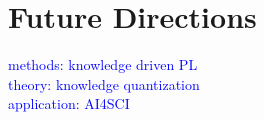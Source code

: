 \section{Future Directions}

\textcolor{blue}{methods: knowledge driven PL}\\
\textcolor{blue}{theory: knowledge quantization}\\
\textcolor{blue}{application: AI4SCI}\\
